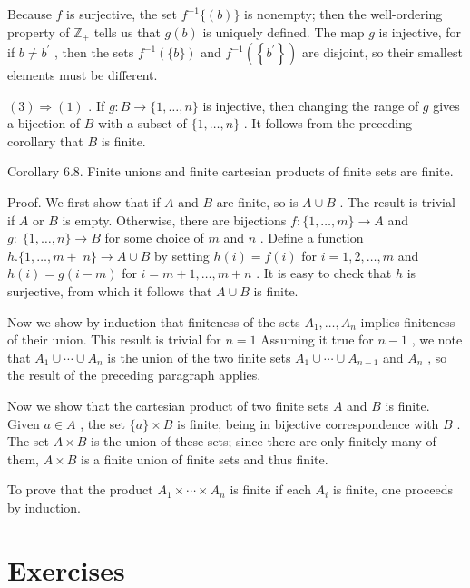 \documentclass[10pt]{article}
\begin{document}
Because \(f\) is surjective, the set \({f}^{-1}\{ \left( b\right) \}\) is nonempty; then the well-ordering property of \({\mathbb{Z}}_{ + }\) tells us that \(g\left( b\right)\) is uniquely defined. The map \(g\) is injective, for if \(b \neq  {b}^{\prime }\) , then the sets \({f}^{-1}\left( {\{ b\} }\right)\) and \({f}^{-1}\left( \left\{  {b}^{\prime }\right\}  \right)\) are disjoint, so their smallest elements must be different.

\(\left( 3\right)  \Rightarrow  \left( 1\right)\) . If \(g : B \rightarrow  \{ 1,\ldots ,n\}\) is injective, then changing the range of \(g\) gives a bijection of \(B\) with a subset of \(\{ 1,\ldots ,n\}\) . It follows from the preceding corollary that \(B\) is finite.

Corollary 6.8. Finite unions and finite cartesian products of finite sets are finite.

Proof. We first show that if \(A\) and \(B\) are finite, so is \(A \cup  B\) . The result is trivial if \(A\) or \(B\) is empty. Otherwise, there are bijections \(f : \{ 1,\ldots ,m\}  \rightarrow  A\) and \(g : \; \{ 1,\ldots ,n\}  \rightarrow  B\) for some choice of \(m\) and \(n\) . Define a function \(h.\{ 1,\ldots ,m + \; n\}  \rightarrow  A \cup  B\) by setting \(h\left( i\right)  = f\left( i\right)\) for \(i = 1,2,\ldots ,m\) and \(h\left( i\right)  = g\left( {i - m}\right)\) for \(i = m + 1,\ldots ,m + n\) . It is easy to check that \(h\) is surjective, from which it follows that \(A \cup  B\) is finite.

Now we show by induction that finiteness of the sets \({A}_{1},\ldots ,{A}_{n}\) implies finiteness of their union. This result is trivial for \(n = 1\) Assuming it true for \(n - 1\) , we note that \({A}_{1} \cup  \cdots  \cup  {A}_{n}\) is the union of the two finite sets \({A}_{1} \cup  \cdots  \cup  {A}_{n - 1}\) and \({A}_{n}\) , so the result of the preceding paragraph applies.

Now we show that the cartesian product of two finite sets \(A\) and \(B\) is finite. Given \(a \in  A\) , the set \(\{ a\}  \times  B\) is finite, being in bijective correspondence with \(B\) . The set \(A \times  B\) is the union of these sets; since there are only finitely many of them, \(A \times  B\) is a finite union of finite sets and thus finite.

To prove that the product \({A}_{1} \times  \cdots  \times  {A}_{n}\) is finite if each \({A}_{i}\) is finite, one proceeds by induction.

\section*{Exercises}
\end{document}
